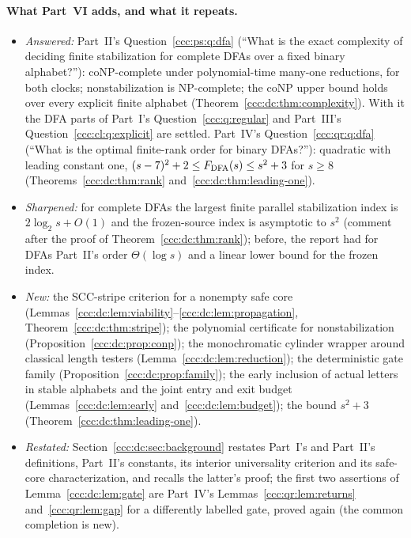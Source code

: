 \documentclass[11pt,letterpaper]{article}
\theoremstyle{definition}
\theoremstyle{remark}
\begin{document}
\paragraph{What Part~VI adds, and what it repeats.}
\begin{itemize}[leftmargin=1.4em,itemsep=1pt]
\item \emph{Answered:} Part~II's Question~\ref{ccc:ps:q:dfa} (``What is the
 exact complexity of deciding finite stabilization for complete DFAs over a
 fixed binary alphabet?''): coNP-complete under polynomial-time many-one
 reductions, for both clocks; nonstabilization is NP-complete; the coNP
 upper bound holds over every explicit finite alphabet
 (Theorem~\ref{ccc:dc:thm:complexity}). With it the DFA parts of Part~I's
 Question~\ref{ccc:q:regular} and Part~III's
 Question~\ref{ccc:cl:q:explicit} are settled. Part~IV's
 Question~\ref{ccc:qr:q:dfa} (``What is the optimal finite-rank order for
 binary DFAs?''): quadratic with leading constant one,
 $(s-7)^2+2\le F_{\rm DFA}(s)\le s^2+3$ for $s\ge8$
 (Theorems~\ref{ccc:dc:thm:rank} and~\ref{ccc:dc:thm:leading-one}).
\item \emph{Sharpened:} for complete DFAs the largest finite parallel
 stabilization index is $2\log_2s+O(1)$ and the frozen-source index is
 asymptotic to $s^2$ (comment after the proof of
 Theorem~\ref{ccc:dc:thm:rank}); before, the report had for DFAs Part~II's
 order $\Theta(\log s)$ and a linear lower bound for the frozen index.
\item \emph{New:} the SCC-stripe criterion for a nonempty safe core
 (Lemmas~\ref{ccc:dc:lem:viability}--\ref{ccc:dc:lem:propagation},
 Theorem~\ref{ccc:dc:thm:stripe}); the polynomial certificate for
 nonstabilization (Proposition~\ref{ccc:dc:prop:conp}); the monochromatic
 cylinder wrapper around classical length testers
 (Lemma~\ref{ccc:dc:lem:reduction}); the deterministic gate family
 (Proposition~\ref{ccc:dc:prop:family}); the early inclusion of actual
 letters in stable alphabets and the joint entry and exit budget
 (Lemmas~\ref{ccc:dc:lem:early} and~\ref{ccc:dc:lem:budget}); the bound
 $s^2+3$ (Theorem~\ref{ccc:dc:thm:leading-one}).
\item \emph{Restated:} Section~\ref{ccc:dc:sec:background} restates Part~I's
 and Part~II's definitions, Part~II's constants, its interior universality
 criterion and its safe-core characterization, and recalls the latter's
 proof; the first two assertions of Lemma~\ref{ccc:dc:lem:gate} are
 Part~IV's Lemmas~\ref{ccc:qr:lem:returns} and~\ref{ccc:qr:lem:gap} for a
 differently labelled gate, proved again (the common completion is new).

\end{itemize}
\end{document}
